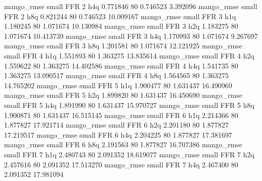        mango_rmse      small      FFR                 2                  h4q  0.771846 80       0.746523           3.392096
       mango_rmse      small      FFR                 2                  h8q  0.821244 80       0.746523          10.009167
       mango_rmse      small      FFR                 3                  h1q  1.180245 80       1.071674          10.130984
       mango_rmse      small      FFR                 3                  h2q  1.183275 80       1.071674          10.413739
       mango_rmse      small      FFR                 3                  h4q  1.170993 80       1.071674           9.267697
       mango_rmse      small      FFR                 3                  h8q  1.201581 80       1.071674          12.121925
       mango_rmse      small      FFR                 4                  h1q  1.551893 80       1.363275          13.835614
       mango_rmse      small      FFR                 4                  h2q  1.559622 80       1.363275          14.402586
       mango_rmse      small      FFR                 4                  h4q  1.541735 80       1.363275          13.090517
       mango_rmse      small      FFR                 4                  h8q  1.564565 80       1.363275          14.765202
       mango_rmse      small      FFR                 5                  h1q  1.900477 80       1.631437          16.490969
       mango_rmse      small      FFR                 5                  h2q  1.899820 80       1.631437          16.450690
       mango_rmse      small      FFR                 5                  h4q  1.891990 80       1.631437          15.970727
       mango_rmse      small      FFR                 5                  h8q  1.900871 80       1.631437          16.515145
       mango_rmse      small      FFR                 6                  h1q  2.214366 80       1.877827          17.921714
       mango_rmse      small      FFR                 6                  h2q  2.201180 80       1.877827          17.219517
       mango_rmse      small      FFR                 6                  h4q  2.204225 80       1.877827          17.381697
       mango_rmse      small      FFR                 6                  h8q  2.191563 80       1.877827          16.707386
       mango_rmse      small      FFR                 7                  h1q  2.480743 80       2.091352          18.619077
       mango_rmse      small      FFR                 7                  h2q  2.457616 80       2.091352          17.513270
       mango_rmse      small      FFR                 7                  h4q  2.467400 80       2.091352          17.981094
